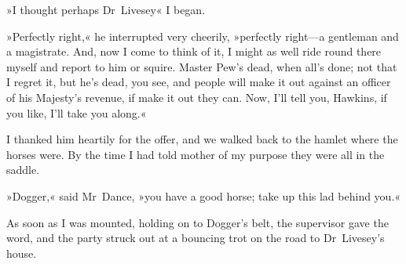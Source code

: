 »I thought perhaps Dr~Livesey\longdash« I began.

»Perfectly right,« he interrupted very cheerily, »perfectly right—a gentleman and a magistrate. And, now I come to think of it, I might as well ride round there myself and report to him or squire. Master Pew's dead, when all's done; not that I regret it, but he's dead, you see, and people will make it out against an officer of his Majesty's revenue, if make it out they can. Now, I'll tell you, Hawkins, if you like, I'll take you along.«

I thanked him heartily for the offer, and we walked back to the hamlet where the horses were. By the time I had told mother of my purpose they were all in the saddle.

»Dogger,« said Mr~Dance, »you have a good horse; take up this lad behind you.«

As soon as I was mounted, holding on to Dogger's belt, the supervisor gave the word, and the party struck out at a bouncing trot on the road to Dr~Livesey's house.